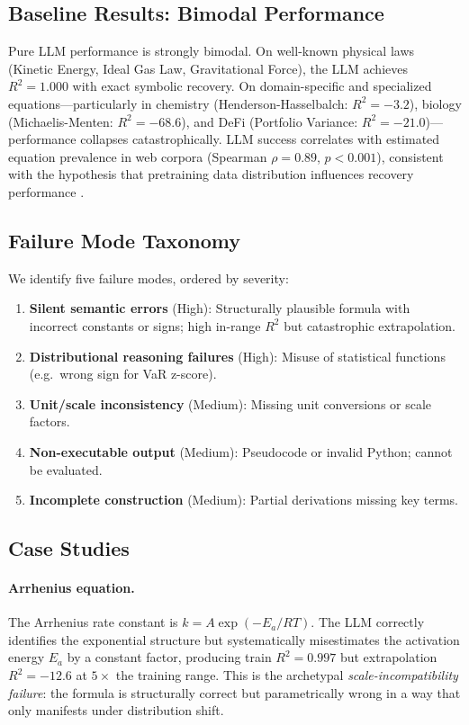 \documentclass[twoside,11pt]{article}
\newcommand{\Rsq}{R^{2}}
\begin{document}
\subsection{Baseline Results: Bimodal Performance}\label{subsec:baseline-results-bimodal-performance}
\label{sec:llm_baseline}

Pure LLM performance is strongly bimodal. On well-known physical laws (Kinetic Energy, Ideal Gas Law, Gravitational Force), the LLM achieves $\Rsq = 1.000$ with exact symbolic recovery. On domain-specific and specialized equations---particularly in chemistry (Henderson-Hasselbalch: $\Rsq = -3.2$), biology (Michaelis-Menten: $\Rsq = -68.6$), and DeFi (Portfolio Variance: $\Rsq = -21.0$)---performance collapses catastrophically. LLM success correlates with estimated equation prevalence in web corpora (Spearman $\rho = 0.89$, $p < 0.001$), consistent with the hypothesis that pretraining data distribution influences recovery performance \citep{kambhampati2024llms}.

\subsection{Failure Mode Taxonomy}\label{subsec:failure-mode-taxonomy}
\label{sec:llm_failures}

We identify five failure modes, ordered by severity:
\begin{enumerate}
  \item \textbf{Silent semantic errors} (High): Structurally plausible formula with incorrect constants or signs; high in-range $\Rsq$ but catastrophic extrapolation.
  \item \textbf{Distributional reasoning failures} (High): Misuse of statistical functions (e.g.\ wrong sign for VaR z-score).
  \item \textbf{Unit/scale inconsistency} (Medium): Missing unit conversions or scale factors.
  \item \textbf{Non-executable output} (Medium): Pseudocode or invalid Python; cannot be evaluated.
  \item \textbf{Incomplete construction} (Medium): Partial derivations missing key terms.
\end{enumerate}

\subsection{Case Studies}\label{subsec:case-studies}
\label{sec:llm_cases}

\paragraph{Arrhenius equation.}
The Arrhenius rate constant is $k = A \exp\!(-E_a/RT)$. The LLM correctly identifies the exponential structure but systematically misestimates the activation energy $E_a$ by a constant factor, producing train $\Rsq = 0.997$ but extrapolation $\Rsq = -12.6$ at $5\times$ the training range. This is the archetypal \emph{scale-incompatibility failure}: the formula is structurally correct but parametrically wrong in a way that only manifests under distribution shift.
\end{document}
